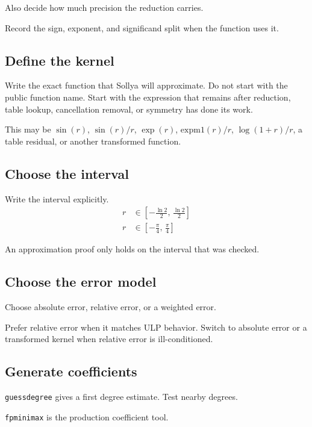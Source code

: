 \documentclass[manuscript, nonacm]{acmart}
\begin{document}
    Also decide how much precision the reduction carries.

    Record the sign, exponent, and significand split when the function uses it.

    \subsection{Define the kernel}

    Write the exact function that Sollya will approximate. Do not start with the
    public function name. Start with the expression that remains after reduction,
    table lookup, cancellation removal, or symmetry has done its work.

    This may be $\sin(r)$, $\sin(r)/r$, $\exp(r)$, $\mathrm{expm1}(r)/r$,
    $\log(1+r)/r$, a table residual, or another transformed function.

    \subsection{Choose the interval}

    Write the interval explicitly.
    \begin{align*}
        r &\in \left[-\frac{\ln 2}{2},\, \frac{\ln 2}{2}\right] \\[4pt]
        r &\in \left[-\frac{\pi}{4},\, \frac{\pi}{4}\right]
    \end{align*}

    An approximation proof only holds on the interval that was checked.

    \subsection{Choose the error model}

    Choose absolute error, relative error, or a weighted error.

    Prefer relative error when it matches ULP behavior. Switch to absolute error
    or a transformed kernel when relative error is ill-conditioned.

    \subsection{Generate coefficients}

    \texttt{guessdegree} gives a first degree estimate. Test nearby degrees.

    \texttt{fpminimax} is the production coefficient tool.
\end{document}
